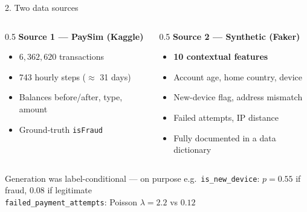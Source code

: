 \documentclass[aspectratio=169]{beamer}
\begin{document}
\begin{frame}{2. Two data sources}
\begin{columns}[T]
\begin{column}{0.5\textwidth}
\textbf{Source 1 --- PaySim (Kaggle)}
\begin{itemize}
    \item $6{,}362{,}620$ transactions
    \item 743 hourly steps ($\approx$ 31 days)
    \item Balances before/after, type, amount
    \item Ground-truth \texttt{isFraud}
\end{itemize}
\end{column}
\begin{column}{0.5\textwidth}
\textbf{Source 2 --- Synthetic (Faker)}
\begin{itemize}
    \item \textbf{10 contextual features}
    \item Account age, home country, device
    \item New-device flag, address mismatch
    \item Failed attempts, IP distance
    \item Fully documented in a data dictionary
\end{itemize}
\end{column}
\end{columns}

\vspace{1em}
\begin{block}{Generation was label-conditional --- on purpose}
e.g.\ \texttt{is\_new\_device}: $p = 0.55$ if fraud, $0.08$ if legitimate\\
\texttt{failed\_payment\_attempts}: Poisson $\lambda = 2.2$ vs $0.12$
\end{block}
\end{frame}
\end{document}
